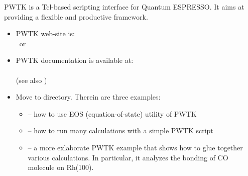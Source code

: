 \documentclass[landscape]{foils}
\begin{document}

PWTK is a Tcl-based scripting interface for Quantum ESPRESSO. It aims
at providing a flexible and productive framework.

\begin{itemize}
\item PWTK web-site is:\\
   ~or~ 
\item PWTK documentation is available at:\\
  \\
  (see also )
\end{itemize}

\begin{itemize}
\item  Move to  directory. Therein are three
  examples:
  \begin{itemize}
  \item {} -- how to use EOS (equation-of-state) utility
    of PWTK
    \vspace{0.5em}
  \item {} -- how to run many calculations with a
    simple PWTK script
    \vspace{0.5em}
  \item {} -- a more exlaborate PWTK example that
    shows how to glue together various calculations. In particular, it
    analyzes the bonding of CO molecule on Rh(100).
  \end{itemize}
\end{itemize}

\rightheader{}
\end{document}
